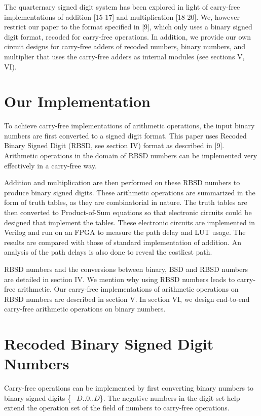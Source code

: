 \documentclass[conference]{IEEEtran}
\begin{document}
The quarternary signed digit system has been explored in light of carry-free implementations of addition [15-17] and multiplication [18-20]. We, however restrict our paper to the format specified in [9], which only uses a binary signed digit format, recoded for carry-free operations. In addition, we provide our own circuit designs for carry-free adders of recoded numbers, binary numbers, and multiplier that uses the carry-free adders as internal modules (see sections V, VI).


\section{Our Implementation}

To achieve carry-free implementations of arithmetic operations, the input binary numbers are first converted to a signed digit format. This paper uses Recoded Binary Signed Digit (RBSD, see section IV) format as described in [9]. Arithmetic operations in the domain of RBSD numbers can be implemented very effectively in a carry-free way.

Addition and multiplication are then performed on these RBSD numbers to produce binary signed digits. These arithmetic operations are summarized in the form of truth tables, as they are combinatorial in nature. The truth tables are then converted to Product-of-Sum equations so that electronic circuits could be designed that implement the tables. These electronic circuits are implemented in Verilog and run on an FPGA to measure the path delay and LUT usage. The results are compared with those of standard implementation of addition. An analysis of the path delays is also done to reveal the costliest path.

RBSD numbers and the conversions between binary, BSD and RBSD numbers are detailed in section IV. We mention why using RBSD numbers leads to carry-free arithmetic. Our carry-free implementations of arithmetic operations on RBSD numbers are described in section V. In section VI, we design end-to-end carry-free arithmetic operations on binary numbers.


\section{Recoded Binary Signed Digit Numbers}

Carry-free operations can be implemented by first converting binary numbers to binary signed digits \{$-D$..$0$..$D$\}. The negative numbers in the digit set help extend the operation set of the field of numbers to carry-free operations.
\end{document}

